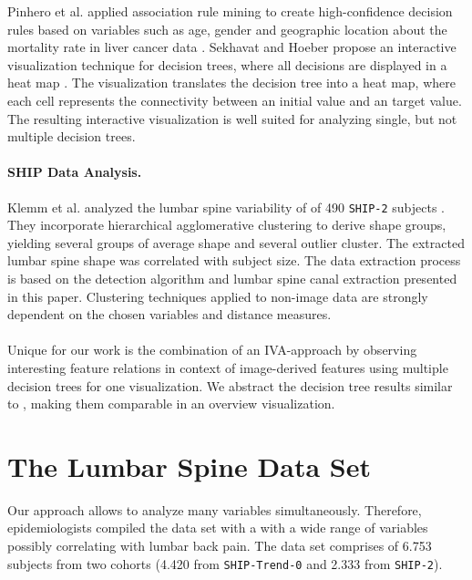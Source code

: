 \documentclass[a4paper,twoside]{style/article}
\begin{document}
Pinhero et al. applied association rule mining to create high-confidence decision rules based on variables such as age, gender and geographic location about the mortality rate in liver cancer data \cite{Pinheiro}.
Sekhavat and Hoeber propose an interactive visualization technique for decision trees, where all decisions are displayed in a heat map \cite{Sekhavat}.
The visualization translates the decision tree into a heat map, where each cell represents the connectivity between an initial value and an target value.
The resulting interactive visualization is well suited for analyzing single, but not multiple decision trees.
\paragraph{SHIP Data Analysis.}
Klemm et al. analyzed the lumbar spine variability of of 490 \texttt{SHIP-2} subjects \cite{Klemm2013VMV}.
They incorporate hierarchical agglomerative clustering to derive shape groups, yielding several groups of average shape and several outlier cluster.
The extracted lumbar spine shape was correlated with subject size.
The data extraction process is based on the detection algorithm and lumbar spine canal extraction presented in this paper.
Clustering techniques applied to non-image data are strongly dependent on the chosen variables and distance measures.
\\\\
Unique for our work is the combination of an IVA-approach by observing interesting feature relations in context of image-derived features using multiple decision trees for one visualization.
We abstract the decision tree results similar to \cite{Turkay}, making them comparable in an overview visualization.
\section{The Lumbar Spine Data Set}
\label{sec:MaterialsAndMethod}
\noindent Our approach allows to analyze many variables simultaneously.
Therefore, epidemiologists compiled the data set with a with a wide range of variables possibly correlating with lumbar back pain.
The data set comprises of 6.753 subjects from two cohorts (4.420 from \texttt{SHIP-Trend-0} and 2.333 from \texttt{SHIP-2}).

\end{document}
